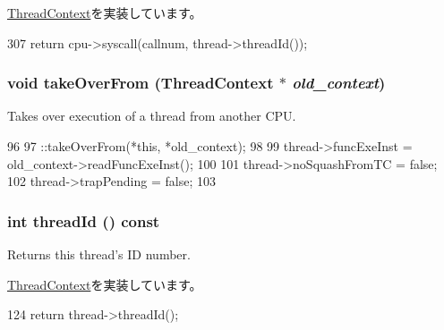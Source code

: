 \hyperlink{classThreadContext_ae5fdd7da5d82e981c65cbd6115dcfe60}{ThreadContext}を実装しています。


\begin{DoxyCode}
307     { return cpu->syscall(callnum, thread->threadId()); }
\end{DoxyCode}
\hypertarget{classInOrderThreadContext_af121f4812cba8e37d675cddada8e47ed}{
\subsubsection[{takeOverFrom}]{\setlength{\rightskip}{0pt plus 5cm}void takeOverFrom ({\bf ThreadContext} $\ast$ {\em old\_\-context})}}
\label{classInOrderThreadContext_af121f4812cba8e37d675cddada8e47ed}
Takes over execution of a thread from another CPU. 


\begin{DoxyCode}
96 {
97     ::takeOverFrom(*this, *old_context);
98 
99     thread->funcExeInst = old_context->readFuncExeInst();
100 
101     thread->noSquashFromTC = false;
102     thread->trapPending = false;
103 }
\end{DoxyCode}
\hypertarget{classInOrderThreadContext_afc38d04c77e7b5fc3bbb0dd00fc87742}{
\subsubsection[{threadId}]{\setlength{\rightskip}{0pt plus 5cm}int threadId () const}}
\label{classInOrderThreadContext_afc38d04c77e7b5fc3bbb0dd00fc87742}
Returns this thread's ID number. 

\hyperlink{classThreadContext_a79882224329589b18076ee3f2f45d99f}{ThreadContext}を実装しています。


\begin{DoxyCode}
124 { return thread->threadId(); }
\end{DoxyCode}


